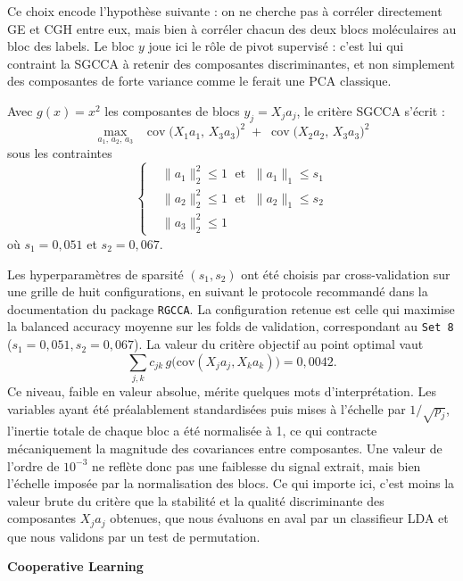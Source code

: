 \documentclass[a4paper,11pt]{paper}
\theoremstyle{plain}
\theoremstyle{definition}
\theoremstyle{remark}
\begin{document}
Ce choix encode l'hypothèse suivante : on ne cherche pas à corréler directement GE et CGH entre eux, mais bien à corréler chacun des deux blocs moléculaires au bloc des labels. Le bloc $y$ joue ici le rôle de pivot supervisé : c'est lui qui contraint la SGCCA à retenir des composantes discriminantes, et non simplement des composantes de forte variance comme le ferait une PCA classique.

Avec $g(x) = x^2$ les composantes de blocs $y_j = X_j a_j$, le critère SGCCA s'écrit :
\[
    \max_{a_1,\,a_2,\,a_3}\;\;
    \operatorname{cov}\!\bigl(X_1 a_1,\, X_3 a_3\bigr)^2
    \;+\;
    \operatorname{cov}\!\bigl(X_2 a_2,\, X_3 a_3\bigr)^2
\]
sous les contraintes
\[
    \left\{
    \begin{aligned}
         & \|a_1\|_2^2 \leqslant 1 \;\text{ et }\; \|a_1\|_1 \leqslant s_1 \\
         & \|a_2\|_2^2 \leqslant 1 \;\text{ et }\; \|a_2\|_1 \leqslant s_2 \\
         & \|a_3\|_2^2 \leqslant 1
    \end{aligned}
    \right.
\]
où $s_1 = 0{,}051$ et $s_2 = 0{,}067$.

Les hyperparamètres de sparsité $(s_1, s_2)$ ont été choisis par cross-validation sur une grille de huit configurations, en suivant le protocole recommandé dans la documentation du package \texttt{RGCCA}. La configuration retenue est celle qui maximise la balanced accuracy moyenne sur les folds de validation, correspondant au \texttt{Set 8} ($s_1 = 0{,}051, s_2 = 0{,}067$). La valeur du critère objectif au point optimal vaut
$$
    \sum_{j,k} c_{jk}\, g\bigl(\mathrm{cov}(X_j a_j, X_k a_k)\bigr) = 0{,}0042.
$$
Ce niveau, faible en valeur absolue, mérite quelques mots d'interprétation. Les variables ayant été préalablement standardisées puis mises à l'échelle par $1/\sqrt{p_j}$, l'inertie totale de chaque bloc a été normalisée à 1, ce qui contracte mécaniquement la magnitude des covariances entre composantes. Une valeur de l'ordre de $10^{-3}$ ne reflète donc pas une faiblesse du signal extrait, mais bien l'échelle imposée par la normalisation des blocs. Ce qui importe ici, c'est moins la valeur brute du critère que la stabilité et la qualité discriminante des composantes $X_j a_j$ obtenues, que nous évaluons en aval par un classifieur LDA et que nous validons par un test de permutation.


\bigskip


\begin{center}
    \Large \textbf{\textbf{Cooperative Learning}}
\end{center}
\end{document}
